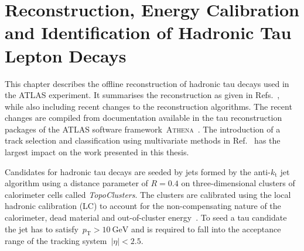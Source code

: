 \chapter{Reconstruction, Energy Calibration and
  Identification of Hadronic Tau Lepton Decays}
\label{sec:reconstruction}

%
%
This chapter describes the offline reconstruction of hadronic tau decays used in
the ATLAS experiment. It summarises the reconstruction as given in Refs.\
\cite{atlas:taurec:run1, atlas:taurec:run2}, while also including recent changes
to the reconstruction algorithms. The recent changes are compiled from
documentation available in the tau reconstruction packages of the ATLAS software
framework~\textsc{Athena}~\cite{athena}. The introduction of a track selection
and classification using multivariate methods in Ref.\ \cite{duschinger} has the
largest impact on the work presented in this thesis.

Candidates for hadronic tau decays are seeded by jets formed by the
anti-$k_\mathrm{t}$ jet algorithm using a distance parameter of $R = 0.4$ on
three-dimensional clusters of calorimeter cells called \emph{TopoClusters}. The
clusters are calibrated using the local hadronic calibration (LC) to account for
the non-compensating nature of the calorimeter, dead material and out-of-cluster
energy~\cite{local_hadronic_calib}. To seed a tau candidate the jet has to
satisfy~$p_\text{T} > \SI{10}{\GeV}$ and is required to fall into the acceptance
range of the tracking system~$|\eta| < \num{2.5}$.

